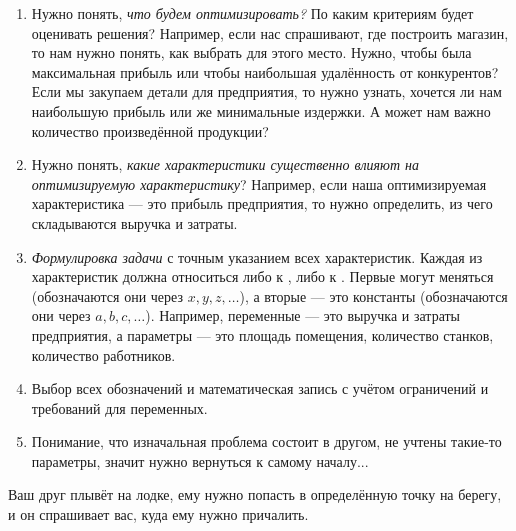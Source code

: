 \begin{enumerate}[nosep]
	\item Нужно понять, \textit{что будем оптимизировать?} По каким критериям будет оценивать решения? Например, если нас спрашивают, где построить магазин, то нам нужно понять, как выбрать для этого место. Нужно, чтобы была максимальная прибыль или чтобы наибольшая удалённость от конкурентов? Если мы закупаем детали для предприятия, то нужно узнать, хочется ли нам наибольшую прибыль или же минимальные издержки. А может нам важно количество произведённой продукции?
	
	\item Нужно понять, \textit{какие характеристики существенно влияют на оптимизируемую характеристику}? Например, если наша оптимизируемая характеристика --- это прибыль предприятия, то нужно определить, из чего складываются выручка и затраты.
	
	\item \textit{Формулировка задачи} с точным указанием всех характеристик. Каждая из характеристик должна относиться либо к , либо к . Первые могут меняться (обозначаются они через $x, y, z, \dots$), а вторые --- это константы (обозначаются они через $a, b, c, \dots$). Например, переменные --- это выручка и затраты предприятия, а параметры --- это площадь помещения, количество станков, количество работников.
	
	\item Выбор всех обозначений и математическая запись с учётом ограничений и требований для переменных.
	
	\item Понимание, что изначальная проблема состоит в другом, не учтены такие-то параметры, значит нужно вернуться к самому началу...
\end{enumerate}

\example

Ваш друг плывёт на лодке, ему нужно попасть в определённую точку на берегу, и он спрашивает вас, куда ему нужно причалить.

\begin{center}
\end{center}

